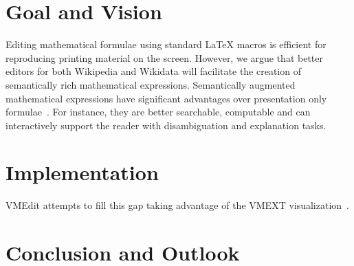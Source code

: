 \documentclass{llncs}
\begin{document}
\section{Goal and Vision}
Editing mathematical formulae using standard \LaTeX{} macros is efficient for reproducing printing material on the screen.
However, we argue that better editors for both Wikipedia and Wikidata will facilitate the creation of semantically rich mathematical expressions.
Semantically augmented mathematical expressions have significant advantages over presentation only formulae~\cite{dis}.
For instance, they are better searchable, computable and can interactively support the reader with disambiguation and explanation tasks.
\section{Implementation}
VMEdit attempts to fill this gap taking advantage of the VMEXT visualization~\cite{vmext17}.
\section{Conclusion and Outlook}
\printbibliography
\end{document}
